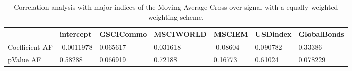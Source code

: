 \begin{table}[H]
\centering
\begin{tabular}{lllllll}
& intercept & GSCICommo & MSCIWORLD & MSCIEM & USDindex & GlobalBonds \\ 
\hline 
Coefficient AF & -0.0011978 & 0.065617 & 0.031618 & -0.08604 & 0.090782 & 0.33386 \\ 
pValue AF & 0.58288 & 0.066919 & 0.72188 & 0.16773 & 0.61024 & 0.078229 \\ 
\hline
\end{tabular}
\caption{Correlation analysis with major indices of the Moving Average Cross-over signal with a equally weighted weighting scheme.}
\label{MAEW_AFACTOR}
\end{table}